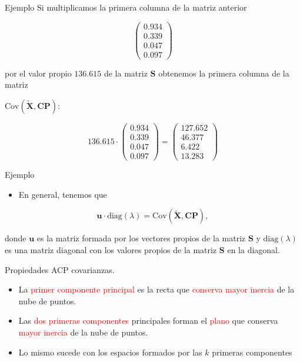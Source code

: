 \documentclass[
  ignorenonframetext,
]{beamer}
\providecommand{\tightlist}{%
  \setlength{\itemsep}{0pt}\setlength{\parskip}{0pt}}
\newcommand\red[1]{\textcolor{red}{#1}}
\begin{document}
\begin{frame}{Ejemplo}
\protect\hypertarget{ejemplo-20}{}
Si multiplicamos la primera columna de la matriz anterior

\[
\begin{pmatrix}
0.934\\ 0.339\\ 0.047\\ 0.097
\end{pmatrix}
\]

por el valor propio \(136.615\) de la matriz \(\mathbf{S}\) obtenemos la
primera columna de la matriz

\(\mbox{Cov}(\tilde{\mathbf{X}},\mathbf{CP})\):

\[
136.615\cdot \begin{pmatrix}0.934\\ 0.339\\ 0.047\\ 0.097\end{pmatrix}=
\begin{pmatrix}
127.652 \\ 46.377 \\ 6.422 \\ 13.283
\end{pmatrix}
\]
\end{frame}

\begin{frame}{Ejemplo}
\protect\hypertarget{ejemplo-21}{}
\begin{itemize}
\tightlist
\item
  En general, tenemos que
\end{itemize}

\[
\mathbf{u}\cdot \mbox{diag}(\lambda) = \mbox{Cov}(\tilde{\mathbf{X}},\mathbf{CP}),
\]

donde \(\mathbf{u}\) es la matriz formada por los vectores propios de la
matriz \(\mathbf{S}\) y \(\mbox{diag}(\lambda)\) es una matriz diagonal
con los valores propios de la matriz \(\mathbf{S}\) en la diagonal.
\end{frame}

\begin{frame}{Propiedades ACP covarianzas.}
\protect\hypertarget{propiedades-acp-covarianzas.-4}{}
\begin{itemize}
\item
  La \red{primer componente principal} es la recta que \red{conserva
  mayor inercia} de la nube de puntos.
\item
  Las \red{dos primeras componentes} principales forman el \red{plano}
  que conserva \red{mayor inercia} de la nube de puntos.
\item
  Lo mismo sucede con los espacios formados por las \(k\) primeras
  componentes
\end{itemize}
\end{frame}
\end{document}
